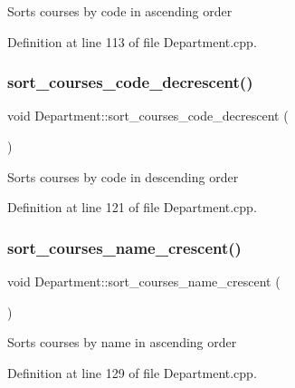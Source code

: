 Sorts courses by code in ascending order 

Definition at line 113 of file Department.\+cpp.

\mbox{\label{classDepartment_a320c23411a02eba00f00a15895c538b2}} 
\subsubsection{\texorpdfstring{sort\+\_\+courses\+\_\+code\+\_\+decrescent()}{sort\_courses\_code\_decrescent()}}
{\footnotesize\ttfamily void Department\+::sort\+\_\+courses\+\_\+code\+\_\+decrescent (\begin{DoxyParamCaption}{ }\end{DoxyParamCaption})}

Sorts courses by code in descending order 

Definition at line 121 of file Department.\+cpp.

\mbox{\label{classDepartment_a020f24af6978f0033895e8ebde27bbfb}} 
\subsubsection{\texorpdfstring{sort\+\_\+courses\+\_\+name\+\_\+crescent()}{sort\_courses\_name\_crescent()}}
{\footnotesize\ttfamily void Department\+::sort\+\_\+courses\+\_\+name\+\_\+crescent (\begin{DoxyParamCaption}{ }\end{DoxyParamCaption})}

Sorts courses by name in ascending order 

Definition at line 129 of file Department.\+cpp.

\mbox{\label{classDepartment_a7798d17dd46c0859cf6ce68c7ec434ae}} 
